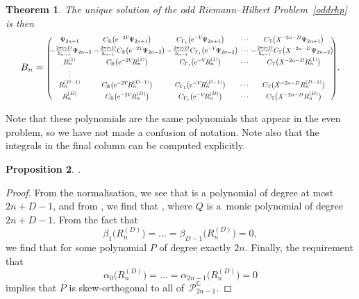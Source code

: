 \documentclass[pdftex]{sigma}
\numberwithin{equation}{section}
\newtheorem{Theorem}{Theorem}[section]
\newtheorem{Proposition}[Theorem]{Proposition}
\begin{document}
\begin{Theorem}
The unique solution of the \textit{odd} Riemann--Hilbert Problem~{\rm\ref{oddrhp}} is then
\begin{gather*}
B_{n} =
\resizebox{.87\hsize}{!}{$\left(\begin{matrix}
\Psi_{2n+1} & C_\mathbb{R}\big({\rm e}^{-2V}\!\Psi_{2n+1}\big) & C_{\Gamma_1}\big({\rm e}^{-V}\!\Psi_{2n+1}\big) & \cdots & C_{\mathbb{T}}\big(\mathit{X}^{-2n-D}\Psi_{2n+1}\big) \\[1mm]
\!\!- \frac{2\pi {\rm i} \gamma D}{h_{n-1}}\Psi_{2n-2}\!\!\!\! & - \frac{2\pi {\rm i} \gamma D}{h_{n-1}} C_\mathbb{R}\big({\rm e}^{-2V}\!\Psi_{2n-2}\big)\!\!\!\! & - \frac{2\pi {\rm i} \gamma D}{h_{n-1}} C_{\Gamma_1}\big({\rm e}^{-V}\!\Psi_{2n-2}\big)\!\!\!\! & \cdots &\!\!\!\!\! - \frac{2\pi {\rm i} \gamma D}{h_{n-1}} C_{\mathbb{T}}\big(\mathit{X}^{-2n-D}\Psi_{2n-2}\big)\!\! \\[1mm]
R^{(1)}_n & C_\mathbb{R}\big({\rm e}^{-2V}\!R^{(1)}_n\big) & C_{\Gamma_1}\big({\rm e}^{-V}\!R^{(1)}_n\big) & \cdots & C_{\mathbb{T}}\big(\mathit{X}^{-2n-D}R^{(1)}_n\big) \\
\vdots \\
R^{(D-1)}_n & C_\mathbb{R}\big({\rm e}^{-2V}\!R^{(D-1)}_n\big) & C_{\Gamma_1}\big({\rm e}^{-V}\!R^{(D-1)}_n\big) & \cdots & C_{\mathbb{T}}\big(\mathit{X}^{-2n-D}R^{(D-1)}_n\big) \\[1mm]
R^{(D)}_n & C_\mathbb{R}\big({\rm e}^{-2V}\!R^{(D)}_n\big) & C_{\Gamma_1}\big({\rm e}^{-V}\!R^{(D)}_n\big) & \cdots & C_{\mathbb{T}}\big(\mathit{X}^{-2n-D} R^{(D)}_n\big)
\end{matrix}\right)$}.
\end{gather*}
\end{Theorem}
Note that these polynomials  are the same polynomials that appear in the even problem, so we have not made a confusion of notation. Note also that the integrals in the final column can be computed explicitly.

\begin{Proposition} .
\end{Proposition}
\begin{proof}
From the normalisation, we see that  is a polynomial of degree at most $2n+D-1$, and from , we find that , where $Q$ is a~monic polynomial of degree $2n+D-1$. From the fact that
\[
\beta_1\big(R^{(D)}_n\big) = \dots = \beta_{D-1}\big(R^{(D)}_n\big) = 0,
\] we find that  for some polynomial $P$ of degree exactly $2n$. Finally, the requirement that
\[
\alpha_0\big(R^{(D)}_n\big) = \dots = \alpha_{2n-1}\big(R^{(D)}_n\big) = 0
\]
 implies that $P$ is skew-orthogonal to all of~$\mathscr{P}_{2n-1}^\mathbb{C}$.
\end{proof}
\end{document}
